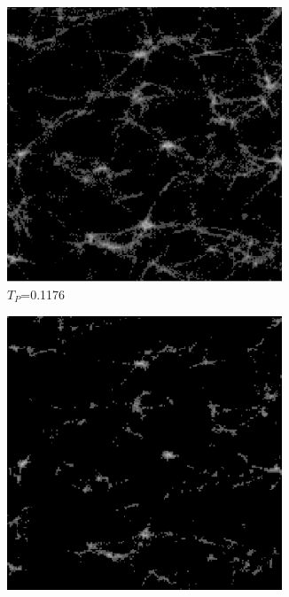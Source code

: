 \begin{figure}[H]
\begin{minipage}{0.5\textwidth}
  \begin{subfigure}{0.5\textwidth}
    \centering
    \includegraphics[width=0.9\textwidth]{Figures/chapter-image/distance/fig_dist_01176Otsu.png}
    \caption{$T_P$=0.1176}
    \label{distotsu}
  \end{subfigure}%
  \begin{subfigure}{0.5\textwidth}
    \centering
    \includegraphics[width=0.9\textwidth]{Figures/chapter-image/distance/fig_dist_20.png}

\end{subfigure}
\end{minipage}
\end{figure}
